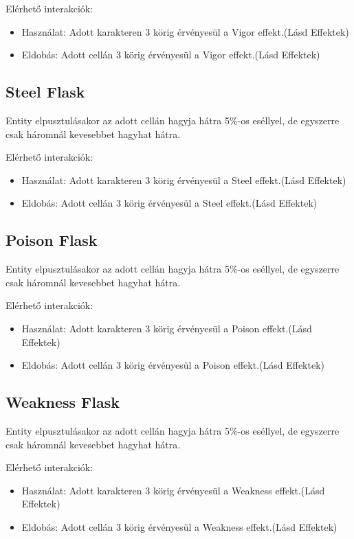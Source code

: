 \noindent Elérhető interakciók:
\begin{itemize}
    \item Használat: Adott karakteren 3 körig érvényesül a Vigor effekt.(Lásd Effektek)
    \item Eldobás: Adott cellán 3 körig érvényesül a Vigor effekt.(Lásd Effektek)
\end{itemize}

\subsection{Steel Flask}

Entity elpusztulásakor az adott cellán hagyja hátra 5\%-os eséllyel, de egyszerre csak háromnál kevesebbet hagyhat hátra.

\noindent Elérhető interakciók:
\begin{itemize}
    \item Használat: Adott karakteren 3 körig érvényesül a Steel effekt.(Lásd Effektek)
    \item Eldobás: Adott cellán 3 körig érvényesül a Steel effekt.(Lásd Effektek)
\end{itemize}

\subsection{Poison Flask}

Entity elpusztulásakor az adott cellán hagyja hátra 5\%-os eséllyel, de egyszerre csak háromnál kevesebbet hagyhat hátra.

\noindent Elérhető interakciók:
\begin{itemize}
    \item Használat: Adott karakteren 3 körig érvényesül a Poison effekt.(Lásd Effektek)
    \item Eldobás: Adott cellán 3 körig érvényesül a Poison effekt.(Lásd Effektek)
\end{itemize}

\subsection{Weakness Flask}

Entity elpusztulásakor az adott cellán hagyja hátra 5\%-os eséllyel, de egyszerre csak háromnál kevesebbet hagyhat hátra.

\noindent Elérhető interakciók:
\begin{itemize}
    \item Használat: Adott karakteren 3 körig érvényesül a Weakness effekt.(Lásd Effektek)
    \item Eldobás: Adott cellán 3 körig érvényesül a Weakness effekt.(Lásd Effektek)
\end{itemize}

